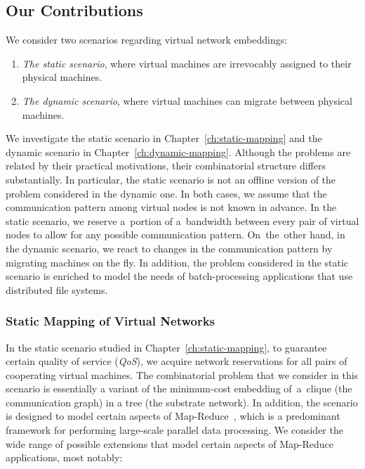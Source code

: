 \subsection{Our Contributions}

We consider two scenarios regarding virtual network embeddings:
\begin{enumerate}
  \item \emph{The static scenario}, where virtual machines are irrevocably assigned to their physical machines.
  \item \emph{The dynamic scenario}, where virtual machines can migrate between physical machines.
\end{enumerate}

We investigate the static scenario in Chapter~\ref{ch:static-mapping} and the dynamic scenario in Chapter~\ref{ch:dynamic-mapping}.
Although the problems are related by their practical motivations, their combinatorial structure differs substantially.
In particular, the static scenario is not an offline version of the problem considered in the dynamic one.
In both cases, we assume that the communication pattern among virtual nodes is not known in advance.
In the static scenario, we reserve a~portion of a~bandwidth between every pair of virtual nodes to allow for any possible communication pattern.
On~the~other hand, in the dynamic scenario, we react to changes in the communication pattern by migrating machines on the fly.
In addition, the problem considered in the static scenario is enriched to model the needs of batch-processing applications that use distributed file systems.


\subsubsection{Static Mapping of Virtual Networks}
\label{sec:contributions-static-mapping}

In the static scenario studied in Chapter~\ref{ch:static-mapping}, to guarantee certain quality of service (\emph{QoS}), we acquire network reservations for all pairs of cooperating virtual machines.
The combinatorial problem that we consider in this scenario is essentially a variant of the minimum-cost embedding of~a~clique (the communication graph) in a tree (the substrate network).
In addition, the scenario is designed to model certain aspects of Map-Reduce~\cite{mapreduce}, which is a predominant framework for performing large-scale parallel data processing.
We consider the wide range of possible extensions that model certain aspects of Map-Reduce applications, most notably:

